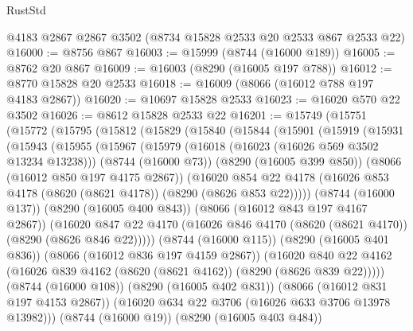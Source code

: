 \begin{lexlean}{RustStd}
\begin{coremodule}
    @4183
    @2867
    @2867
    @3502
    (@8734 @15828 @2533 @20 @2533 @867 @2533 @22)
@16000 := @8756 @867
@16003 := @15999 (@8744 (@16000 @189))
@16005 := @8762 @20 @867
@16009 := @16003 (@8290 (@16005 @197 @788))
@16012 := @8770 @15828 @20 @2533
@16018 := @16009 (@8066 (@16012 @788 @197 @4183 @2867))
@16020 := @10697 @15828 @2533
@16023 := @16020 @570 @22 @3502
@16026 := @8612 @15828 @2533 @22
@16201 := @15749
    (@15751
      (@15772
        (@15795
          (@15812
            (@15829
              (@15840
                (@15844
                  (@15901
                    (@15919
                      (@15931
                        (@15943
                          (@15955
                            (@15967
                              (@15979
                                (@16018 (@16023 (@16026 @569 @3502 @13234 @13238)))
                                (@8744 (@16000 @73))
                                (@8290 (@16005 @399 @850))
                                (@8066 (@16012 @850 @197 @4175 @2867))
                                (@16020
                                  @854
                                  @22
                                  @4178
                                  (@16026
                                    @853
                                    @4178
                                    (@8620 (@8621 @4178))
                                    (@8290 (@8626 @853 @22)))))
                              (@8744 (@16000 @137))
                              (@8290 (@16005 @400 @843))
                              (@8066 (@16012 @843 @197 @4167 @2867))
                              (@16020
                                @847
                                @22
                                @4170
                                (@16026 @846 @4170 (@8620 (@8621 @4170)) (@8290 (@8626 @846 @22)))))
                            (@8744 (@16000 @115))
                            (@8290 (@16005 @401 @836))
                            (@8066 (@16012 @836 @197 @4159 @2867))
                            (@16020
                              @840
                              @22
                              @4162
                              (@16026 @839 @4162 (@8620 (@8621 @4162)) (@8290 (@8626 @839 @22)))))
                          (@8744 (@16000 @108))
                          (@8290 (@16005 @402 @831))
                          (@8066 (@16012 @831 @197 @4153 @2867))
                          (@16020 @634 @22 @3706 (@16026 @633 @3706 @13978 @13982)))
                        (@8744 (@16000 @19))
                        (@8290 (@16005 @403 @484))

\end{coremodule}
\end{lexlean}
